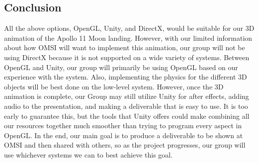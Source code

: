 \documentclass[onecolumn, draftclsnofoot,10pt, compsoc]{IEEEtran}
\begin{document}
\subsection{Conclusion}
All the above options, OpenGL, Unity, and DirectX, would be suitable for our 3D animation of the Apollo 11 Moon landing. However, with our limited information about how OMSI will want to implement this animation, our group will not be using DirectX because it is not supported on a wide variety of systems. Between OpenGL and Unity, our group will primarily be using OpenGL based on our experience with the system. Also, implementing the physics for the different 3D objects will be best done on the low-level system. However, once the 3D animation is complete, our Group may still utilize Unity for after effects, adding audio to the presentation, and making a deliverable that is easy to use. It is too early to guarantee this, but the tools that Unity offers could make combining all our resources together much smoother than trying to program every aspect in OpenGL. In the end, our main goal is to produce a deliverable to be shown at OMSI and then shared with others, so as the project progresses, our group will use whichever systems we can to best achieve this goal. 
\end{document}
